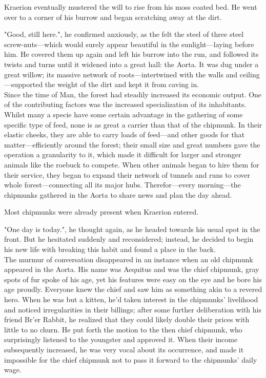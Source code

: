 Kraerion eventually mustered the will to rise from his moss coated bed. He went over to a corner of his burrow and began scratching away at the dirt.

"Good, still here.", he confirmed anxiously, as the felt the steel of three steel screw-nuts---which would surely appear beautiful in the sunlight---laying before him. He covered them up again and left his burrow into the run, and followed its twists and turns until it widened into a great hall: the Aorta. It was dug under a great willow; its massive network of roots---intertwined with the walls and ceiling---supported the weight of the dirt and kept it from caving in.\\

Since the time of Man, the forest had steadily increased its economic output. One of the  contributing factors was the increased specialization of its inhabitants. Whilst many a specie have some certain advantage in the gathering of some specific type of feed, none is as great a carrier than that of the chipmunk. In their elastic cheeks, they are able to carry loads of feed---and other goods for that matter---efficiently around the forest; their small size and great numbers gave the operation a granularity to it, which made it difficult for larger and stronger animals like the roebuck to compete. When other animals began to hire them for their service, they began to expand their network of tunnels and runs to cover whole forest---connecting all its major hubs. Therefor---every morning---the chipmunks gathered in the Aorta to share news and plan the day ahead.

Most chipmunks were already present when Kraerion entered. 

"One day is today.", he thought again, as he headed towards his usual spot in the front. But he hesitated suddenly and reconsidered; instead, he decided to begin his new life with breaking this habit and found a place in the back.\\

The murmur of conversation disappeared in an instance when an old chipmunk appeared in the Aorta. His name was Aequitus and was the chief chipmunk, gray spots of fur spoke of his age, yet his features were easy on the eye and he bore his age proudly. Everyone knew the chief and saw him as something akin to a revered hero. When he was but a kitten, he'd taken interest in the chipmunks' livelihood and noticed irregularities in their billings; after some further deliberation with his friend Br'er Rabbit, he realized that they could likely double their prices with little to no churn. He put forth the motion to the then chief chipmunk, who surprisingly listened to the youngster and approved it. When their income subsequently increased, he was very vocal about its occurrence, and made it impossible for the chief chipmunk not to pass it forward to the chipmunks' daily wage.

